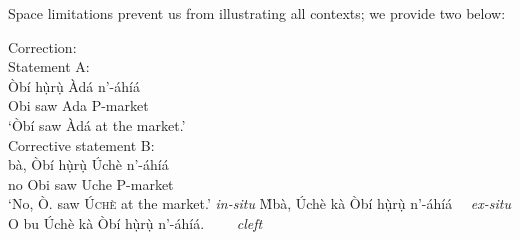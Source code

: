 \documentclass[output=paper,colorlinks,citecolor=brown]{langscibook}
\begin{document}
Space limitations prevent us from illustrating all contexts; we provide two below:



\ea%
    \label{ex:amaechi:9}
    Correction:\\\vspace*{-0.2cm}
    \ea\label{ex:amaechi:9a}
    Statement A:\\
    \gll    Òbí hụ̀rụ̀ Àdá n'-áhíá\\
            Obi saw Ada P-market\\
    \glt    `Òbí saw {Àdá} at the market.'\\
    \ex\label{ex:amaechi:9b}
    Corrective statement B:\\
        \ea\label{ex:amaechi:9bi}
        bà, Òbí hụ̀rụ̀ Úchè n'-áhíá\\
                no Obi saw Uche P-market\\
        \glt    `No, Ò. saw \textsc{Úchè} at the market.' \textit{in-situ}
        \ex\label{ex:amaechi:9bii}
                {\`M}bà, Úchè kà Òbí hụ̀rụ̀   n'-áhíá ~~\textit{ex-situ}
        \ex\label{ex:amaechi:9biii}
                O bu Úchè kà Òbí hụ̀rụ̀   n'-áhíá. ~~~~\textit{cleft}
        \z
    \z
\z
\end{document}
